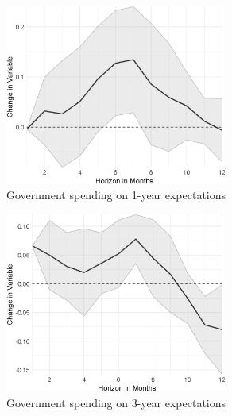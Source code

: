 \newpage
\begin{figure}
	\centering
	\captionsetup{font=footnotesize}
	\begin{subfigure}{00.24\textwidth}
		\includegraphics[width=0.8\textwidth]{output/lp/baseline/bHP/government_spending/government_spendingonexpectations1y_djn.eps}
		\caption{Government spending on 1-year expectations}
	\end{subfigure}
	\begin{subfigure}{00.24\textwidth}
		\includegraphics[width=0.8\textwidth]{output/lp/baseline/bHP/government_spending/government_spendingonexpectations3y_djn.eps}
		\caption{Government spending on 3-year expectations}
	\end{subfigure}
	\begin{subfigure}{00.24\textwidth}

\end{subfigure}
\end{figure}
